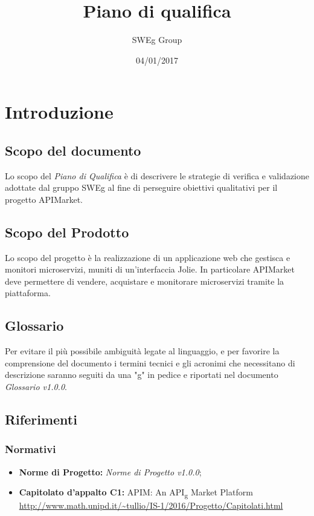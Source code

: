 \documentclass[12pt,a4paper,titlepage]{article}
\begin{document}
 
	\title{Piano di qualifica}
	\author{SWEg Group}
	\date{04/01/2017}
	\maketitle
	\tableofcontents
	\thispagestyle{empty}
	\newpage
	\section{Introduzione}
	\subsection{Scopo del documento}
	Lo scopo del \textit{Piano di Qualifica} è di descrivere le strategie di verifica e validazione adottate dal gruppo SWEg al fine di perseguire obiettivi qualitativi per il progetto APIMarket.
	\subsection{Scopo del Prodotto}
	Lo scopo del progetto è la realizzazione di un applicazione web che gestisca e monitori microservizi, muniti di un'interfaccia Jolie. In particolare APIMarket deve permettere di vendere, acquistare e monitorare microservizi tramite la piattaforma. 
	\subsection{Glossario}
	Per evitare il più possibile ambiguità legate al linguaggio, e per favorire la comprensione del documento i termini tecnici e gli acronimi che necessitano di descrizione saranno seguiti da una "g" in pedice e riportati nel documento \textit{Glossario v1.0.0}.
	\subsection{Riferimenti}
	\subsubsection{Normativi}
	\begin{itemize}
		\item \textbf{Norme di Progetto:} \textit{Norme di Progetto v1.0.0};
		\item \textbf{Capitolato d'appalto C1:} APIM: An API\textsubscript{g} Market Platform\\
			\url{http://www.math.unipd.it/~tullio/IS-1/2016/Progetto/Capitolati.html}
	\end{itemize}
\end{document}
